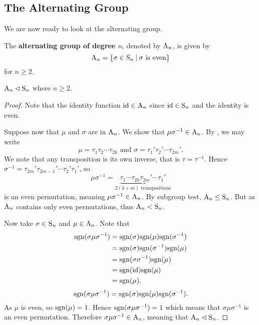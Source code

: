 \subsection{The Alternating Group}
We are now ready to look at the alternating group.
\begin{definition}
    The \textbf{alternating group of degree $n$}, denoted by $\mathrm{A}_{n}$, is given by
    \[
        \An{n} = \left\{\sigma \in \Sn{n} \vert \sigma \text{ is even}\right\}
    \]
    for $n \geq 2$.
\end{definition}

\begin{proposition}\label{prop-An-normal-subgroup-of-Sn}
    $\mathrm{A}_{n} \lhd \mathrm{S}_{n}$ where $n \geq 2$.
\end{proposition}
\begin{proof}
    Note that the identity function $\mathrm{id} \in \mathrm{A}_{n}$ since $\mathrm{id} \in \mathrm{S}_{n}$ and the identity is even.

    Suppose now that $\mu$ and $\sigma$ are in $\mathrm{A}_{n}$. We show that $\mu\sigma^{-1} \in \mathrm{A}_{n}$. By , we may write
    \[
        \mu = \tau_1\tau_2\cdots\tau_{2k} \text{ and } \sigma = \tau_1'\tau_2'\cdots\tau_{2m}'.
    \]
    We note that any transposition is its own inverse, that is $\tau = \tau^{-1}$. Hence $\sigma^{-1} = \tau_{2m}'\tau_{2m-1}'\cdots\tau_2'\tau_1'$, so
    \[
        \mu\sigma^{-1} = \underbrace{\tau_1\cdots\tau_{2k}\tau_{2m}'\cdots\tau_1'}_{2(k+m) \text{ transpositions}}
    \]
    is an even permutation, meaning $\mu\sigma^{-1} \in \mathrm{A}_{n}$. By subgroup test, $\mathrm{A}_{n} \leq \mathrm{S}_{n}$. But as $\mathrm{A}_{n}$ contains only even permutations, thus $\mathrm{A}_{n} < \mathrm{S}_{n}$.
    
    Now take $\sigma \in \mathrm{S}_{n}$ and $\mu \in \mathrm{A}_{n}$. Note that
    \begin{align*}
        \mathrm{sgn}(\sigma\mu\sigma^{-1}) &= \mathrm{sgn}(\sigma)\mathrm{sgn}(\mu)\mathrm{sgn}(\sigma^{-1})\\
        &= \mathrm{sgn}(\sigma)\mathrm{sgn}(\sigma^{-1})\mathrm{sgn}(\mu)\\
        &= \mathrm{sgn}(\sigma\sigma^{-1})\mathrm{sgn}(\mu)\\
        &= \mathrm{sgn}(\mathrm{id})\mathrm{sgn}(\mu)\\
        &= \mathrm{sgn}(\mu).
    \end{align*}
    \[
        \mathrm{sgn}(\sigma\mu\sigma^{-1}) = \mathrm{sgn}(\sigma)\mathrm{sgn}(\mu)\mathrm{sgn}(\sigma^{-1}).
    \]
    As $\mu$ is even, so $\mathrm{sgn}(\mu) = 1$. Hence $\mathrm{sgn}(\sigma\mu\sigma^{-1}) = 1$ which means that $\sigma\mu\sigma^{-1}$ is an even permutation. Therefore $\sigma\mu\sigma^{-1} \in \mathrm{A}_{n}$, meaning that $\mathrm{A}_{n} \lhd \mathrm{S}_{n}$.
\end{proof}


